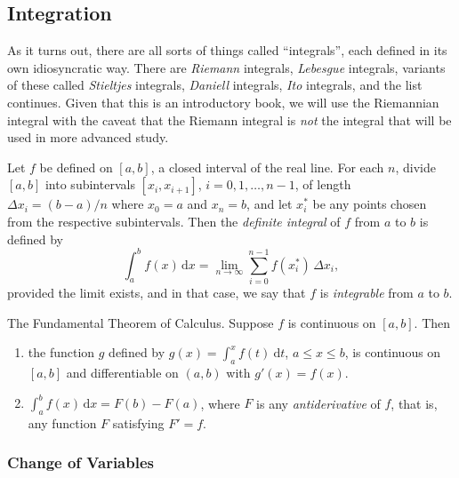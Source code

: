 \documentclass[captions=tableheading]{scrbook}
\begin{document}
\begin{example}
\subsection{Integration}
\label{sec-21-2-4}

As it turns out, there are all sorts of things called ``integrals'', each defined in its own idiosyncratic way. There are \emph{Riemann} integrals, \emph{Lebesgue} integrals, variants of these called \emph{Stieltjes} integrals, \emph{Daniell} integrals, \emph{Ito} integrals, and the list continues. Given that this is an introductory book, we will use the Riemannian integral with the caveat that the Riemann integral is \emph{not} the integral that will be used in more advanced study.

\begin{defn}
Let \(f\) be defined on \([a,b]\), a closed interval of the real line. For each \(n\), divide \([a,b]\) into subintervals \([x_{i},x_{i+1}]\), \(i=0,1,\ldots,n-1\), of length \(\Delta x_{i}=(b-a)/n\) where \(x_{0}=a\) and \(x_{n}=b\), and let \(x_{i}^{\ast}\) be any points chosen from the respective subintervals. Then the \emph{definite integral} of \(f\) from \(a\) to \(b\) is defined by
\begin{equation}
\int_{a}^{b}f(x)\,\mathrm{d} x=\lim_{n\to\infty}\sum_{i=0}^{n-1}f(x_{i}^{\ast})\,\Delta x_{i},
\end{equation}
provided the limit exists, and in that case, we say that \(f\) is \emph{integrable} from \(a\) to \(b\). 
\end{defn}

\begin{thm}
The Fundamental Theorem of Calculus. Suppose \(f\) is continuous on \([a,b]\). Then
\begin{enumerate}
\item the function \(g\) defined by \(g(x)=\int_{a}^{x}f(t)\:\mathrm{d} t\), \(a\leq x\leq b\), is continuous on \([a,b]\) and differentiable on \((a,b)\) with \(g'(x)=f(x)\).
\item \(\int_{a}^{b}f(x)\,\mathrm{d} x=F(b)-F(a)\), where \(F\) is any \emph{antiderivative} of \(f\), that is, any function \(F\) satisfying \(F'=f\).
\end{enumerate}

\end{thm}
\subsubsection{Change of Variables}
\label{sec-21-2-4-1}


\end{example}
\end{document}
